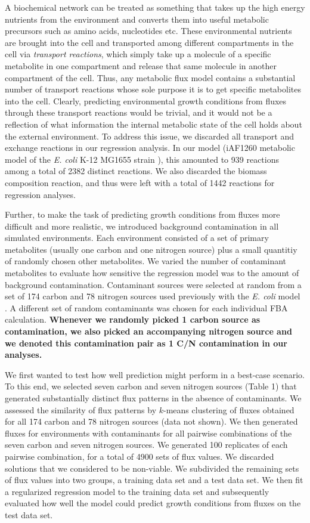\documentclass[12pt]{article}
\begin{document}
A biochemical network can be treated as something that takes up the high energy nutrients from the environment and converts them into useful metabolic precursors such as amino acids, nucleotides etc. These environmental nutrients are brought into the cell and transported among different compartments in the cell via \emph{transport reactions}, which simply take up a molecule of a specific metabolite in one compartment and release that same molecule in another compartment of the cell. Thus, any metabolic flux model contains a substantial number of transport reactions whose sole purpose it is to get specific metabolites into the cell. Clearly, predicting environmental growth conditions from fluxes through these transport reactions would be trivial, and it would not be a reflection of what information the internal metabolic state of the cell holds about the external environment. To address this issue, we discarded all transport and exchange reactions in our regression analysis. In our model (iAF1260 metabolic model of the \emph{E. coli} K-12 MG1655 strain \cite{Schellenbergeretal2010}), this amounted to 939 reactions among a total of 2382 distinct reactions. We also discarded the biomass composition reaction, and thus were left with a total of 1442 reactions for regression analyses.

Further, to make the task of predicting growth conditions from fluxes more difficult and more realistic, we introduced background contamination in all simulated environments. Each environment consisted of a set of primary metabolites (usually one carbon and one nitrogen source) plus a small quantitiy of randomly chosen other metabolites. We varied the number of contaminant metabolites to evaluate how sensitive the regression model was to the amount of background contamination. Contaminant sources were selected at random from a set of 174 carbon and 78 nitrogen sources used previously with the \emph{E. coli} model \cite{Feistetal2007}. A different set of random contaminants was chosen for each individual FBA calculation. \textbf{Whenever we randomly picked 1 carbon source as contamination, we also picked an accompanying nitrogen source and we denoted this contamination pair as 1 C/N contamination in our analyses.}

We first wanted to test how well prediction might perform in a best-case scenario. To this end, we selected seven carbon and seven nitrogen sources (Table 1) that generated substantially distinct flux patterns in the absence of contaminants. We assessed the similarity of flux patterns by $k$-means clustering of fluxes obtained for all 174 carbon and 78 nitrogen sources (data not shown). We then generated fluxes for environments with contaminants for all pairwise combinations of the seven carbon and seven nitrogen sources. We generated 100 replicates of each pairwise combination, for a total of 4900 sets of flux values. We discarded solutions that we considered to be non-viable. We subdivided the remaining sets of flux values into two groups, a training data set and a test data set. We then fit a regularized regression model to the training data set and subsequently evaluated how well the model could predict growth conditions from fluxes on the test data set.
\end{document}
